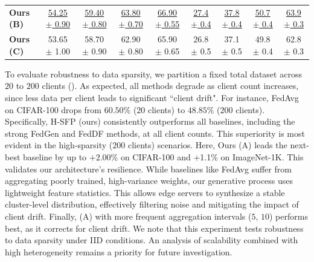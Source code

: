 \begin{table}[!ht]
{\begin{tabular}{l cccc cccc}
        \textbf{Ours (B)} & \underline{54.25 {\scriptsize $\pm$ 0.90}} & \underline{59.40 {\scriptsize $\pm$ 0.80}} & \underline{63.80 {\scriptsize $\pm$ 0.70}} & \underline{66.90 {\scriptsize $\pm$ 0.55}} & \underline{27.4 {\scriptsize $\pm$ 0.4}} & \underline{37.8 {\scriptsize $\pm$ 0.4}} & \underline{50.7 {\scriptsize $\pm$ 0.4}} & \underline{63.9 {\scriptsize $\pm$ 0.3}} \\
        \textbf{Ours (C)} & 53.65 {\scriptsize $\pm$ 1.00} & 58.70 {\scriptsize $\pm$ 0.90} & 62.90 {\scriptsize $\pm$ 0.80} & 65.90 {\scriptsize $\pm$ 0.65} & 26.8 {\scriptsize $\pm$ 0.5} & 37.1 {\scriptsize $\pm$ 0.5} & 49.8 {\scriptsize $\pm$ 0.4} & 62.8 {\scriptsize $\pm$ 0.3} \\
        \bottomrule
    \end{tabular}
    }
\end{table}
    To evaluate robustness to data sparsity, we partition a fixed total dataset across $20$ to $200$ clients (). As expected, all methods degrade as client count increases, since less data per client leads to significant ``client drift". For instance, FedAvg on CIFAR-100 drops from $60.50\%$ ($20$ clients) to $48.85\%$ ($200$ clients). Specifically, H-SFP (ours) consistently outperforms all baselines, including the strong FedGen and FedDF methods, at all client counts. This superiority is most evident in the high-sparsity ($200$ clients) scenarios. Here, Ours (A) leads the next-best baseline by up to $+2.00\%$ on CIFAR-100 and +1.1\% on ImageNet-1K. This validates our architecture's resilience. While baselines like FedAvg suffer from aggregating poorly trained, high-variance weights, our generative process uses lightweight feature statistics. This allows edge servers to synthesize a stable cluster-level distribution, effectively filtering noise and mitigating the impact of client drift. Finally, (A) with more frequent aggregation intervals ($5,\,10$) performs best, as it corrects for client drift. We note that this experiment tests robustness to data sparsity under IID conditions. An analysis of scalability combined with high heterogeneity remains a priority for future investigation.

